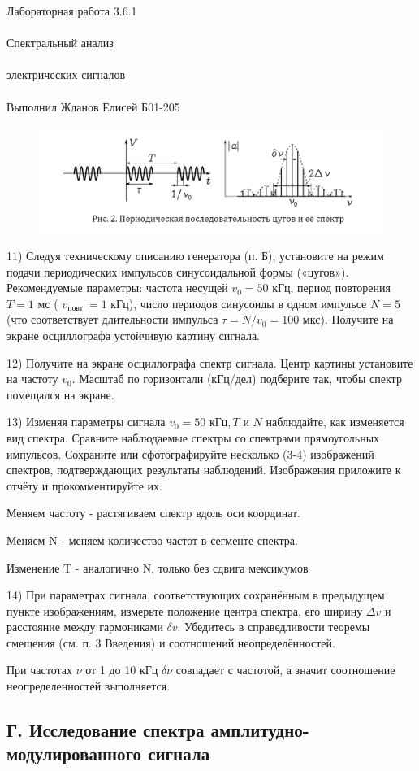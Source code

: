 \documentclass{astroedu-lab}
\begin{document}
\begin{problem}{\huge Лабораторная работа 3.6.1\\\\Спектральный анализ\\\\электрических сигналов\\\\Выполнил Жданов Елисей Б01-205}
\begin{figure}[!h]
	\centering
	\includegraphics[width=1\textwidth]{im/2.png}
	\label{fig:boiler}
\end{figure}

11) Следуя техническому описанию генератора (п. Б), установите на режим подачи периодических импульсов синусоидальной формы («цугов»). Рекомендуемые параметры: частота несущей $v_0=50$ кГц, период повторения
$T=1$ мс ( $v_{\text {повт }}=1$ кГц), число периодов синусоиды в одном импульсе $N=5$ (что соответствует длительности импульса $\tau=N / v_0=100$ мкс). Получите на экране осциллографа устойчивую картину сигнала.

12) Получите на экране осциллографа спектр сигнала. Центр картины установите на частоту $v_0$. Масштаб по горизонтали (кГц/дел) подберите так, чтобы спектр помещался на экране.

13) Изменяя параметры сигнала $v_0 = 50 \text{ кГц}, T$ и $N$ наблюдайте, как изменяется вид спектра. Сравните наблюдаемые спектры со спектрами прямоугольных импульсов. Сохраните или сфотографируйте несколько (3-4) изображений спектров, подтверждающих результаты наблюдений. Изображения приложите к отчёту и прокомментируйте их.

Меняем частоту - растягиваем спектр вдоль оси координат.

Меняем N - меняем количество частот в сегменте спектра.

Изменение T - аналогично N, только без сдвига мексимумов

14) При параметрах сигнала, соответствующих сохранённым в предыдущем пункте изображениям, измерьте положение центра спектра, его ширину $\Delta v$ и расстояние между гармониками $\delta v$. Убедитесь в справедливости теоремы смещения (см. п. 3 Введения) и соотношений неопределённостей.

При частотах $\nu$ от 1 до 10 кГц $\delta \nu$ совпадает с частотой, а значит соотношение неопределенностей выполняется.

\subsection{Г. Исследование спектра амплитудно-модулированного сигнала}


\end{problem}
\end{document}
